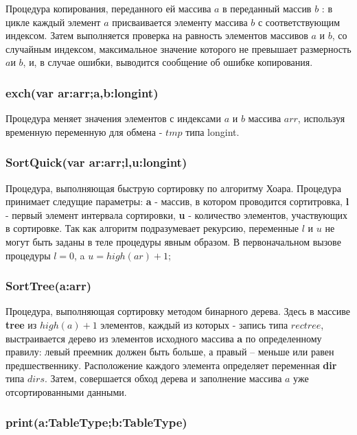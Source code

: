 \documentclass[a4paper,11pt]{article}
\begin{document}
Процедура копирования, переданного ей массива $a$ в переданный массив $b$ : в цикле каждый элемент $a$ присваивается 
элементу массива $b$ с соответствующим индексом. Затем выполняется проверка на равность элементов массивов $a$ и $b$,
со случайным индексом, максимальное значение которого не превышает размерность $a$и $b$, и, в случае ошибки, выводится 
сообщение об ошибке копирования.
\\
\begin{center}
\subsubsection{exch(var ar:arr;a,b:longint)}
\end{center}

Процедура меняет значения элементов с индексами $a$ и $b$ массива $arr$, используя временную переменную для обмена - $tmp$ 
типа longint.
\\
\begin{center}
\subsubsection{SortQuick(var ar:arr;l,u:longint)}
\end{center}

Процедура, выполняющая быструю сортировку по алгоритму Хоара. Процедура принимает следущие параметры: {\bf a} - массив, в котором проводится сортитровка,
{\bf l} - первый элемент интервала сортировки, {\bf u} - количество элементов, участвующих в сортировке. Так как алгоритм подразумевает рекурсию,
переменные $l$ и $u$ не могут быть заданы в теле процедуры явным образом. В первоначальном вызове процедуры $l=0$, a 
$u=high(ar)+1$;
\\
\begin{center}
\subsubsection{SortTree(a:arr)}
\end{center}

Процедура, выполняющая сортировку методом бинарного дерева. Здесь в массиве {\bf tree} из  $high(a)+1$  элементов, каждый из которых - запись типа $rectree$, выстраивается дерево из элементов исходного массива {\bf a} по определенному правилу: левый преемник должен быть больше, а правый -- меньше или равен предшественнику. Расположение каждого элемента определяет 
переменная {\bf dir} типа $dirs$. Затем, совершается обход дерева и заполнение массива $a$ уже отсортированными данными.
\\
\begin{center}
\subsubsection{print(a:TableType;b:TableType)}
\end{center}
\end{document}
